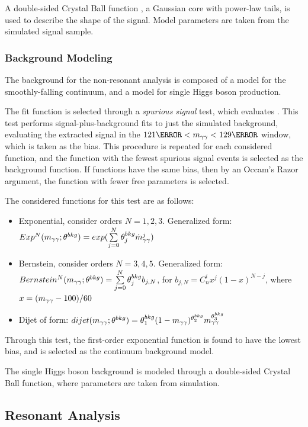 A double-sided Crystal Ball function \cite{dscb-diphoton}, a Gaussian core with power-law tails, is used to describe the shape of the \hhyybb signal. Model parameters are taken from the simulated signal sample.

\subsubsection{Background Modeling} \label{sssec:nonres-bkg-model}

The background for the non-resonant analysis is composed of a model for the smoothly-falling \yy continuum, and a model for single Higgs boson production. 


The fit function is selected through a \textit{spurious signal} test, which evaluates . This test performs signal-plus-background fits to just the simulated background, evaluating the extracted signal in the $\unit{121}{\GeV} < \myy < \unit{129}{\GeV}$ window, which is taken as the bias. This procedure is repeated for each considered function, and the function with the fewest spurious signal events is selected as the background function. If functions have the same bias, then by an Occam's Razor argument, the function with fewer free parameters is selected.

The considered functions for this test are as follows:
\begin{itemize}
  \item Exponential, consider orders $N=1,2,3$. Generalized form: $Exp^N (m_{\gamma\gamma} ; \theta^{bkg}) = exp(\sum\limits_{j=0}^{N} \theta_j^{bkg} \dot m_{\gamma\gamma}^j)$
  \item Bernstein, consider orders $N=3,4,5$. Generalized form: $Bernstein^N (m_{\gamma\gamma} ; \theta^{bkg}) = \sum\limits_{j=0}^{N} \theta_j^{bkg} b_{j,N}$, for $b_{j,N} = C_n^i x^j (1-x)^{N-j}$, where $x= (m_{\gamma\gamma}-100)/60$
  \item Dijet of form: $dijet(m_{\gamma\gamma} ; \theta^{bkg}) = \theta_1^{bkg} (1-m_{\gamma\gamma})^{\theta_2^{bkg}} m_{\gamma\gamma}^{\theta_3^{bkg}}$
\end{itemize}

Through this test, the first-order exponential function is found to have the lowest bias, and is selected as the \yy continuum background model.

The single Higgs boson background is modeled through a double-sided Crystal Ball function, where parameters are taken from simulation.

\subsection{Resonant Analysis}
